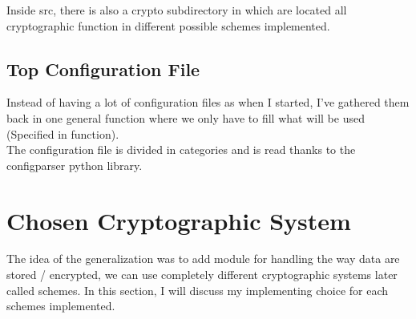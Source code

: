 \documentclass{eplmastersthesis}
\begin{document}
Inside src, there is also a crypto subdirectory in which are located all cryptographic function in different possible schemes implemented.

\subsection{Top Configuration File}
Instead of having a lot of configuration files as when I started, I've gathered them back in one general function where we only have to fill what will be used (Specified in function).\\
The configuration file is divided in categories and is read thanks to the configparser python library.

\section{Chosen Cryptographic System}
The idea of the generalization was to add module for handling the way data are stored / encrypted, we can use completely different cryptographic systems later called schemes. In this section, I will discuss my implementing choice for each schemes implemented.
\end{document}
